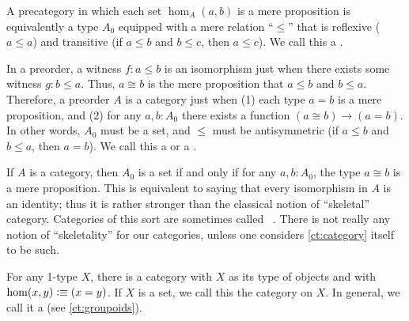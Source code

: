 \documentclass[hott-all.tex]{subfiles}
\begin{document}

\begin{eg}
  A precategory in which each set $\hom_A(a,b)$ is a mere proposition is equivalently a type $A_0$ equipped with a mere relation ``$\le$'' that is reflexive ($a\le a$) and transitive (if $a\le b$ and $b\le c$, then $a\le c$).
  We call this a .

  In a preorder, a witness $f: a\le b$ is an isomorphism just when there exists some witness $g: b\le a$.
  Thus, $a\cong b$ is the mere proposition that $a\le b$ and $b\le a$.
  Therefore, a preorder $A$ is a category just when (1) each type $a=b$ is a mere proposition, and (2) for any $a,b:A_0$ there exists a function $(a\cong b) \to (a=b)$.
  In other words, $A_0$ must be a set, and $\le$ must be antisymmetric (if $a\le b$ and $b\le a$, then $a=b$).
  We call this a  or a .
\end{eg}

\begin{eg}
  If $A$ is a category, then $A_0$ is a set if and only if for any $a,b:A_0$, the type $a\cong b$ is a mere proposition.
  This is equivalent to saying that every isomorphism in $A$ is an identity; thus it is rather stronger than the classical notion of ``skeletal'' category.
  Categories of this sort are sometimes called ~\cite{bsp12infncats}.
  There is not really any notion of ``skeletality'' for our categories, unless one considers \cref{ct:category} itself to be such.
\end{eg}

\begin{eg}
  For any 1-type $X$, there is a category with $X$ as its type of objects and with $\hom(x,y) \vcentcolon\equiv (x=y)$.
  If $X$ is a set, we call this the 
  category on $X$.
  In general, we call it a 
  (see \cref{ct:groupoids}).
\end{eg}
\end{document}

